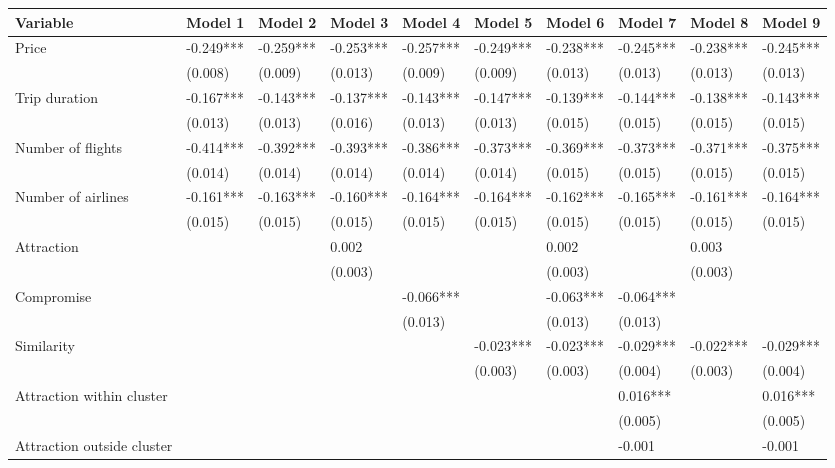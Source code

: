 \documentclass[a4paper,12pt]{article}
\begin{document}
\begin{table}
\centering
\begin{tabular}{p{5cm}*{9}{p{1.7cm}}}
    \hline
        Variable & Model 1 & Model 2 & Model 3 & Model 4 & Model 5 & Model 6 & Model 7 & Model 8 & Model 9 \\ \hline
        \addlinespace
        Price & -0.249*** & -0.259*** & -0.253*** & -0.257*** & -0.249*** & -0.238*** & -0.245*** & -0.238*** & -0.245*** \\ 
         & (0.008) & (0.009) & (0.013) & (0.009) & (0.009) & (0.013) & (0.013) & (0.013) & (0.013) \\ 
        Trip duration & -0.167*** & -0.143*** & -0.137*** & -0.143*** & -0.147*** & -0.139*** & -0.144*** & -0.138*** & -0.143*** \\ 
         & (0.013) & (0.013) & (0.016) & (0.013) & (0.013) & (0.015) & (0.015) & (0.015) & (0.015) \\ 
        Number of flights & -0.414*** & -0.392*** & -0.393*** & -0.386*** & -0.373*** & -0.369*** & -0.373*** & -0.371*** & -0.375*** \\ 
         & (0.014) & (0.014) & (0.014) & (0.014) & (0.014) & (0.015) & (0.015) & (0.015) & (0.015) \\ 
        Number of airlines & -0.161*** & -0.163*** & -0.160*** & -0.164*** & -0.164*** & -0.162*** & -0.165*** & -0.161*** & -0.164*** \\ 
         & (0.015) & (0.015) & (0.015) & (0.015) & (0.015) & (0.015) & (0.015) & (0.015) & (0.015) \\ 
        Attraction &  &  & 0.002 &  &  & 0.002 &  & 0.003 &  \\ 
         &  &  & (0.003) &  &  & (0.003) &  & (0.003) &  \\ 
        Compromise &  &  &  & -0.066*** &  & -0.063*** & -0.064*** &  &  \\ 
         &  &  &  & (0.013) &  & (0.013) & (0.013) &  &  \\ 
        Similarity &  &  &  &  & -0.023*** & -0.023*** & -0.029*** & -0.022*** & -0.029*** \\ 
         &  &  &  &  & (0.003) & (0.003) & (0.004) & (0.003) & (0.004) \\ 
        Attraction within cluster &  &  &  &  &  &  & 0.016*** &  & 0.016*** \\ 
         &  &  &  &  &  &  & (0.005) &  & (0.005) \\ 
        Attraction outside cluster &  &  &  &  &  &  & -0.001 &  & -0.001 \\ 

\end{tabular}
\end{table}
\end{document}
